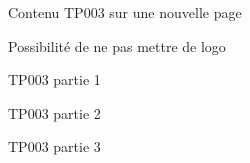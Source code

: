 \begin{TP}
    Contenu TP003 sur une nouvelle page
    
    Possibilité de ne pas mettre de logo
    
    TP003 partie 1
    
    
    TP003 partie 2
    
    
    TP003 partie 3 
\end{TP}